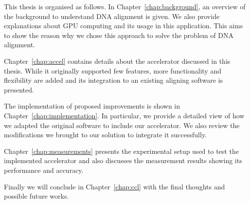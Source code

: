 This thesis is organised as follows. 
In Chapter~\ref{chap:background}, an overview of the background to understand DNA alignment is given. We also provide explanations about GPU computing and its usage in this application. This aims to show the reason why we chose this approach to solve the problem of DNA alignment.

Chapter~\ref{chap:accel} contains details about the accelerator discussed in this thesis. While it originally supported few features, more functionality and flexibility are added and its integration to an existing aligning software is presented.

The implementation of proposed improvements is shown in Chapter~\ref{chap:implementation}. In particular, we provide a detailed view of how we adapted the original software to include our accelerator. We also review the modifications we brought to our solution to integrate it successfully.

Chapter~\ref{chap:measurements} presents the experimental setup used to test the implemented accelerator and also discusses the measurement results showing its performance and accuracy.

Finally we will conclude in Chapter~\ref{chap:ccl} with the final thoughts and possible future works.